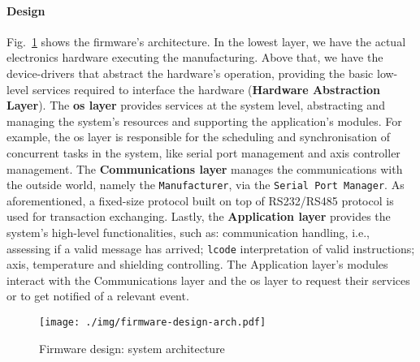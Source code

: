%
\paragraph{Design}
Fig.~\ref{fig:firmware-design-arch} shows the firmware's architecture. In the
lowest layer, we have the actual electronics hardware executing the
manufacturing. Above that, we have the device-drivers that abstract the
hardware's operation, providing the basic low-level services required to
interface the hardware (\textbf{Hardware Abstraction Layer}). The \textbf{\gls{os} layer}
provides services at the system level, abstracting and managing the system's
resources and supporting the application's modules. For example, the \gls{os}
layer is responsible for the scheduling and synchronisation of concurrent tasks
in the system, like serial port management and axis controller management. The
\textbf{Communications layer} manages the communications with the outside world,
namely the \texttt{Manufacturer}, via the \texttt{Serial Port Manager}. As
aforementioned, a fixed-size protocol built on top of RS232/RS485 protocol is
used for transaction exchanging. Lastly, the \textbf{Application layer} provides
the system's high-level functionalities, such as: communication handling, i.e.,
assessing if a valid message has arrived; \texttt{lcode} interpretation of valid
instructions; axis, temperature and shielding controlling. The Application
layer's modules interact with the Communications layer and the \gls{os} layer
to request their services or to get notified of a relevant event.

\begin{figure}[!hbt]
  \centering
    \texttt{[image: ./img/firmware-design-arch.pdf]}
  \caption{Firmware design: system architecture}\label{fig:firmware-design-arch}
\end{figure}

